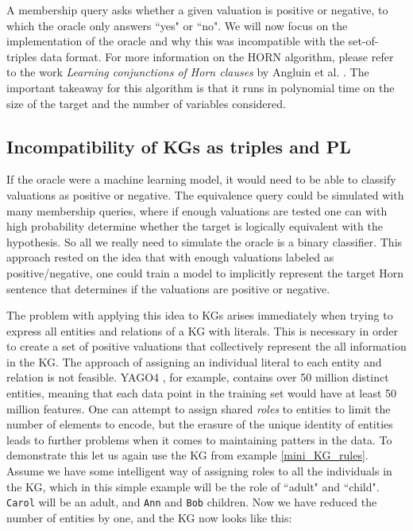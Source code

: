 A membership query asks whether a given valuation is positive or negative, to which the oracle only answers ``yes" or ``no". We will now focus on the implementation of the oracle and why this was incompatible with the set-of-triples data format. For more information on the HORN algorithm, please refer to the work \textit{Learning conjunctions of Horn clauses} by Angluin et al. \cite{DBLP:journals/ml/AngluinFP92}. The important takeaway for this algorithm is that it runs in polynomial time on the size of the target and the number of variables considered.


\subsection{Incompatibility of KGs as triples and PL}
If the oracle were a machine learning model, it would need to be able to classify valuations as positive or negative. The equivalence query could be simulated with many membership queries, where if enough valuations are tested one can with high probability determine whether the target is logically equivalent with the hypothesis. So all we really need to simulate the oracle is a binary classifier. This approach rested on the idea that with enough valuations labeled as positive/negative, one could train a model to implicitly represent the target Horn sentence that determines if the valuations are positive or negative. 

The problem with applying this idea to KGs arises immediately when trying to express all entities and relations of a KG with literals. This is necessary in order to create a set of positive valuations that collectively represent the all information in the KG. The approach of assigning an individual literal to each entity and relation is not feasible. YAGO4 \cite{yago4}, for example, contains over 50 million distinct entities, meaning that each data point in the training set would have at least 50 million features. One can attempt to assign shared \textit{roles} to entities to limit the number of elements to encode, but the erasure of the unique identity of entities leads to further problems when it comes to maintaining patters in the data. To demonstrate this let us again use the KG from example \ref{mini_KG_rules}. Assume we have some intelligent way of assigning roles to all the individuals in the KG, which in this simple example will be the role of ``adult" and ``child". \texttt{Carol} will be an adult, and \texttt{Ann} and \texttt{Bob} children. Now we have reduced the number of entities by one, and the KG now looks like this:

